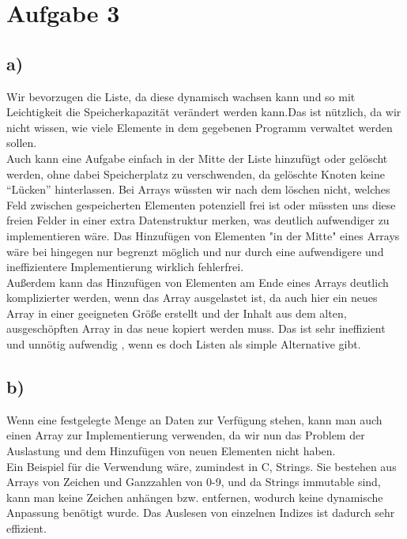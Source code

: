 \documentclass{scrartcl}
\begin{document}
	\section*{Aufgabe 3}
	\subsection*{a)}
	Wir bevorzugen die Liste, da diese dynamisch wachsen kann und so mit Leichtigkeit die Speicherkapazität verändert werden kann.Das ist nützlich, da wir nicht wissen, wie viele Elemente in dem gegebenen Programm verwaltet werden sollen. \\
	Auch kann eine Aufgabe einfach in der Mitte der Liste hinzufügt oder gelöscht werden, ohne dabei Speicherplatz zu verschwenden, da gelöschte Knoten keine “Lücken” hinterlassen. Bei Arrays wüssten wir nach dem löschen nicht, welches Feld zwischen gespeicherten Elementen potenziell frei ist oder müssten uns diese freien Felder in einer extra Datenstruktur merken, was deutlich aufwendiger zu implementieren wäre. Das Hinzufügen von Elementen "in der Mitte" eines Arrays wäre bei hingegen nur begrenzt möglich und nur durch eine aufwendigere und ineffizientere Implementierung wirklich fehlerfrei. \\
	Außerdem kann das Hinzufügen von Elementen am Ende eines Arrays deutlich komplizierter werden, wenn das Array ausgelastet ist, da auch hier ein neues Array in einer geeigneten Größe erstellt und der Inhalt aus dem alten, ausgeschöpften Array in das neue kopiert werden muss. Das ist sehr ineffizient und unnötig aufwendig , wenn es doch Listen als simple Alternative gibt.

	\subsection*{b)}
	Wenn eine festgelegte Menge an Daten zur Verfügung stehen, kann man auch einen Array zur Implementierung verwenden, da wir nun das Problem der Auslastung und dem Hinzufügen von neuen Elementen nicht haben. \\
	Ein Beispiel für die Verwendung wäre, zumindest in C, Strings. Sie bestehen aus Arrays von Zeichen und Ganzzahlen von 0-9, und da Strings immutable sind, kann man keine Zeichen anhängen bzw. entfernen, wodurch keine dynamische Anpassung benötigt wurde. Das Auslesen von einzelnen Indizes ist dadurch sehr effizient.
\end{document}
